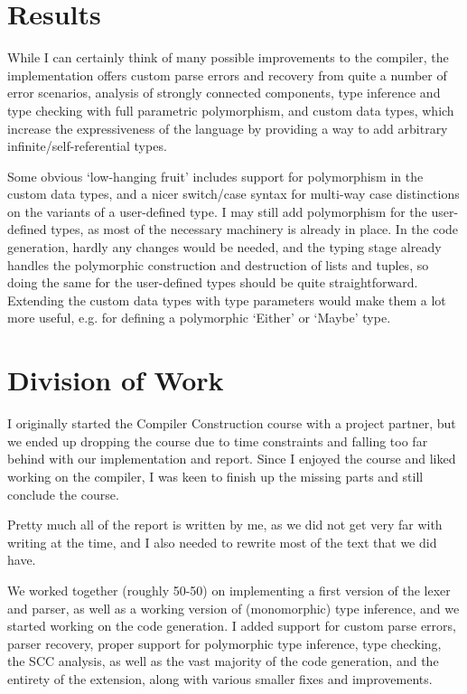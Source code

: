 \section{Results}

While I can certainly think of many possible improvements to the compiler, the
implementation offers custom parse errors and recovery from quite
a number of error scenarios, analysis of strongly connected components, type inference
and type checking with full parametric polymorphism, and custom data types,
which increase the expressiveness of the language by providing a way to add
arbitrary infinite/self-referential types.

Some obvious `low-hanging fruit' includes support for polymorphism in the custom
data types, and a nicer switch/case syntax for multi-way case distinctions on
the variants of a user-defined type.
I may still add polymorphism for the user-defined types, as most of the
necessary machinery is already in place. In the code generation, hardly any
changes would be needed, and the typing stage already handles the polymorphic
construction and destruction of lists and tuples, so doing the same for the
user-defined types should be quite straightforward.
Extending the custom data types with type parameters would make them a lot more
useful, e.g. for defining a polymorphic `Either' or `Maybe' type.


\section{Division of Work}
I originally started the Compiler Construction course with a project partner,
but we ended up dropping the course due to time constraints and falling too far
behind with our implementation and report.
Since I enjoyed the course and liked working on the compiler, I was keen to
finish up the missing parts and still conclude the course.

Pretty much all of the report is written by me, as we did not get very far with
writing at the time, and I also needed to rewrite most of the text that we did have.

We worked together (roughly 50-50) on implementing a first version of the lexer
and parser, as well as a working version of (monomorphic) type
inference, and we started working on the code generation. I added support for
custom parse errors, parser recovery, proper support for polymorphic type
inference, type checking, the SCC analysis, as well as the vast majority of the
code generation, and the entirety of the extension, along with various smaller
fixes and improvements.
